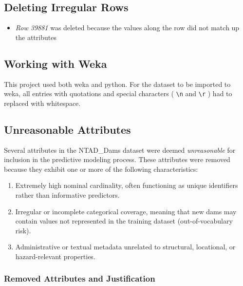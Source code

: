 \documentclass{article}
\begin{document}
\subsection{Deleting Irregular Rows}
\begin{itemize}
    \item \textit{Row 39881} was deleted because the values along the row did not match up the attributes
\end{itemize}

\subsection{Working with Weka}
This project used both weka and python. For the dataset to be imported to weka, all entries with quotations and special characters ( \verb|\n| and \verb|\r| ) had to replaced with whitespace. 

\subsection{Unreasonable Attributes}

Several attributes in the NTAD\_Dams dataset were deemed \textit{unreasonable} for inclusion in the predictive modeling process. These attributes were removed because they exhibit one or more of the following characteristics:
\begin{enumerate}
    \item Extremely high nominal cardinality, often functioning as unique identifiers rather than informative predictors.
    \item Irregular or incomplete categorical coverage, meaning that new dams may contain values not represented in the training dataset (out-of-vocabulary risk).
    \item Administrative or textual metadata unrelated to structural, locational, or hazard-relevant properties.
\end{enumerate}

\subsubsection*{Removed Attributes and Justification}
\end{document}
